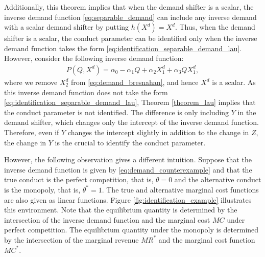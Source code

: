 \documentclass[11pt, a4paper]{article}
\theoremstyle{remark}
\begin{document}
Additionally, this theorem implies that when the demand shifter is a scalar, the inverse demand function \eqref{eq:separable_demand} can include any inverse demand with a scalar demand shifter by putting $h(X^{d})= X^{d}$.
Thus, when the demand shifter is a scalar, the conduct parameter can be identified only when the inverse demand function takes the form \eqref{eq:identification_separable_demand_lau}.
However, consider the following inverse demand function:
\begin{align}
    P(Q, X^{d}) = \alpha_0 - \alpha_1Q + \alpha_2X^{d}_1 + \alpha_3QX^{d}_1, \label{eq:demand_counterexample}
\end{align}
where we remove $X^{d}_2$ from \eqref{eq:demand_bresnahan}, and hence $X^{d}$ is a scalar.
As this inverse demand function does not take the form \eqref{eq:identification_separable_demand_lau}, Theorem \ref{theorem_lau} implies that the conduct parameter is not identified.
The difference is only including $Y$ in the demand shifter, which changes only the intercept of the inverse demand function.
Therefore, even if $Y$ changes the intercept slightly in addition to the change in $Z$, the change in $Y$ is the crucial to identify the conduct parameter.

However, the following observation gives a different intuition.
Suppose that the inverse demand function is given by \eqref{eq:demand_counterexample} and that the true conduct is the perfect competition, that is, $\theta = 0$ and the alternative conduct is the monopoly, that is, $\theta^{*} = 1$.
The true and alternative marginal cost functions are also given as linear functions.
Figure \ref{fig:identification_example} illustrates this environment.
Note that the equilibrium quantity is determined by the intersection of the inverse demand function and the marginal cost $MC$ under perfect competition.
The equilibrium quantity under the monopoly is determined by the intersection of the marginal revenue $MR^{*}$ and the marginal cost function $MC^{*}$.
\end{document}
